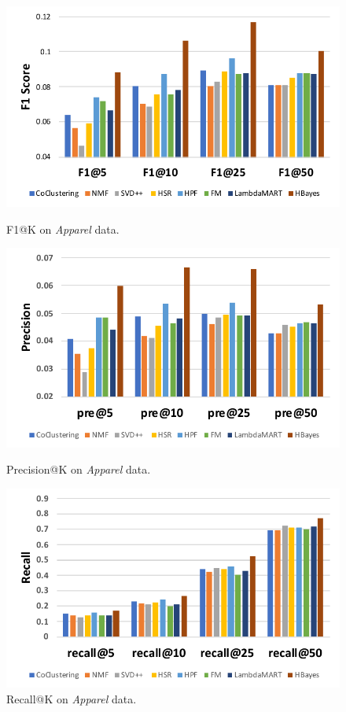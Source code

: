 \begin{figure}[!htb]
  \includegraphics[width=\linewidth]{fig/F1-score_jd}
  \caption{F1@K on \emph{Apparel} data.}
  \label{fig:perf_cmp_F1_apparel}
\endminipage\hfill
{}
  \includegraphics[width=\linewidth]{fig/precision_jd}
  \caption{Precision@K on \emph{Apparel} data.}
  \label{fig:perf_cmp_precision_apparel}
\endminipage\hfill
{}%
  \includegraphics[width=\linewidth]{fig/recall_jd}
  \caption{Recall@K on \emph{Apparel} data.}
  \label{fig:perf_cmp_recall_apparel}
\endminipage
\end{figure}


